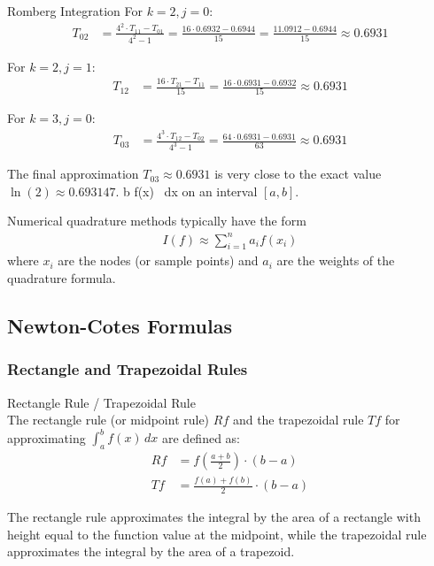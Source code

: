 \begin{example2}{Romberg Integration}
For $k = 2, j = 0$:
\begin{align*}
T_{02} &= \frac{4^2 \cdot T_{11} - T_{01}}{4^2 - 1} = \frac{16 \cdot 0.6932 - 0.6944}{15} = \frac{11.0912 - 0.6944}{15} \approx 0.6931
\end{align*}

For $k = 2, j = 1$:
\begin{align*}
T_{12} &= \frac{16 \cdot T_{21} - T_{11}}{15} = \frac{16 \cdot 0.6931 - 0.6932}{15} \approx 0.6931
\end{align*}

For $k = 3, j = 0$:
\begin{align*}
T_{03} &= \frac{4^3 \cdot T_{12} - T_{02}}{4^3 - 1} = \frac{64 \cdot 0.6931 - 0.6931}{63} \approx 0.6931
\end{align*}

The final approximation $T_{03} \approx 0.6931$ is very close to the exact value $\ln(2) \approx 0.693147$.
b f(x) \, dx
on an interval $[a,b]$.

Numerical quadrature methods typically have the form
\begin{align*}
I(f) \approx \sum_{i=1}^{n} a_i f(x_i)
\end{align*}
where $x_i$ are the nodes (or sample points) and $a_i$ are the weights of the quadrature formula.
\end{example2}

\subsection{Newton-Cotes Formulas}

\subsubsection{Rectangle and Trapezoidal Rules}

\begin{definition}{Rectangle Rule / Trapezoidal Rule}\\
The rectangle rule (or midpoint rule) $Rf$ and the trapezoidal rule $Tf$ for approximating $\int_a^b f(x) \, dx$ are defined as:
\begin{align*}
Rf &= f\left(\frac{a+b}{2}\right) \cdot (b-a)\\
Tf &= \frac{f(a) + f(b)}{2} \cdot (b-a)
\end{align*}

The rectangle rule approximates the integral by the area of a rectangle with height equal to the function value at the midpoint, while the trapezoidal rule approximates the integral by the area of a trapezoid.
\end{definition}

